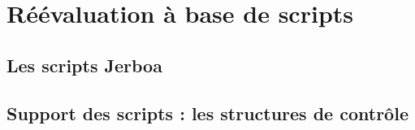 
\chapter{Réévaluation à base de scripts}
\label{cha:scripts}

\section[Les scripts Jerboa]{Les scripts Jerboa}
\label{sec:scripts-jerboa}

\section[Support des scripts : les structures de contrôle]{Support des scripts : les structures de contrôle}
\label{sec:support-scripts-structures-controle}

